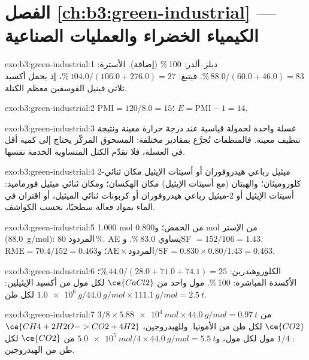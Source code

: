 \section*{الفصل \ref{ch:b3:green-industrial} --- الكيمياء الخضراء والعمليات الصناعية}

\begin{solution}{exo:b3:green-industrial:1}
ديلز--ألدر: 100\,\% (إضافة). الأسترة: $88.0/(60.0 + 46.0) = 83$\,\%. فيتيغ:
$104.0/(106.0 + 276.0) = 27$\,\%، إذ يحمل أكسيد ثلاثي فينيل الفوسفين معظم الكتلة.
\end{solution}

\begin{solution}{exo:b3:green-industrial:2}
$\mathrm{PMI} = 120/8.0 = 15$؛ $E = \mathrm{PMI} - 1 = 14$.
\end{solution}

\begin{solution}{exo:b3:green-industrial:3}
غسلة واحدة لحمولة قياسية عند درجة حرارة معينة ونتيجة تنظيف معينة. فالمنظفات
تُجرَّع بمقادير مختلفة: المسحوق المركّز يحتاج إلى كمية أقل في الغسلة، فلا تقدّم الكتل
المتساوية الخدمة نفسها.
\end{solution}

\begin{solution}{exo:b3:green-industrial:4}
2-ميثيل رباعي هيدروفوران أو أسيتات الإيثيل مكان ثنائي كلوروميثان؛ والهبتان (مع أسيتات
الإيثيل) مكان الهكسان؛ ومكان ثنائي ميثيل فورماميد: أسيتات الإيثيل أو 2-ميثيل رباعي هيدروفوران أو
كربونات ثنائي الميثيل، أو اقتران في الماء بمواد فعالة سطحيًا، بحسب
الكواشف.
\end{solution}

\begin{solution}{exo:b3:green-industrial:5}
1.000 mol من الحمض؛ و0.800 mol من الإستر (\qty{88.0}{g/mol}): المردود 80\,\%. AE يساوي 83.0\,\%. وSF $= 152/106 = 1.43$.
$\mathrm{RME} = 70.4/152 = 0.463$؛ و$\mathrm{AE} \times \text{المردود}/\mathrm{SF} = 0.830 \times 0.80/1.43 = 0.463$.
\end{solution}

\begin{solution}{exo:b3:green-industrial:6}
الكلوروهيدرين: $44.0/(28.0 + 71.0 + 74.1) = 25$\,\%؛ الأكسدة المباشرة: 100\,\%. مول واحد من $\ce{CaCl2}$ لكل مول من
أكسيد الإيثيلين: $\qty{1.0e6}{g}/\qty{44.0}{g/mol} \times \qty{111.1}{g/mol} = \qty{2.5}{t}$ لكل طن.
\end{solution}

\begin{solution}{exo:b3:green-industrial:7}
$3/8 \times \qty{5.88e4}{mol} \times \qty{44.0}{g/mol} = \qty{0.97}{t}$ من $\ce{CO2}$ لكل طن من الأمونيا. وللهيدروجين، $\ce{CH4 + 2H2O -> CO2 + 4H2}$:
$1/4$ مول لكل مول، و$\qty{5.0e5}{mol}/4 \times \qty{44.0}{g/mol} = \qty{5.5}{t}$ من $\ce{CO2}$ لكل طن من الهيدروجين.
\end{solution}

